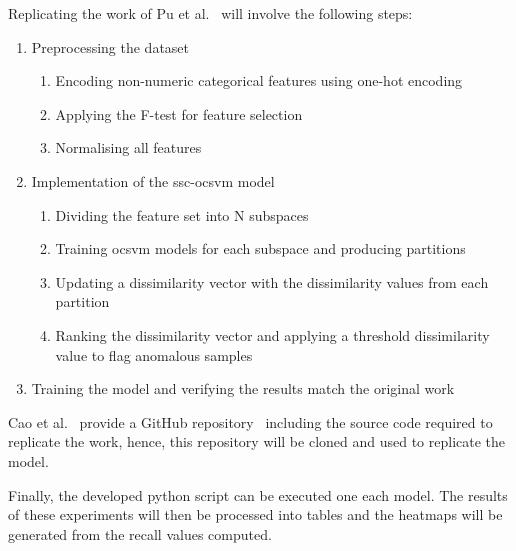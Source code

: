 Replicating the work of Pu et al.~\cite{Pu} will involve the following steps:
\begin{enumerate}
      \item Preprocessing the dataset
            \begin{enumerate}
                  \item Encoding non-numeric categorical features using one-hot encoding
                  \item Applying the F-test for feature selection
                  \item Normalising all features
            \end{enumerate}
      \item Implementation of the \gls{ssc}-\gls{ocsvm} model
      \begin{enumerate}
            \item Dividing the feature set into N subspaces
            \item Training \gls{ocsvm} models for each subspace and producing partitions
            \item Updating a dissimilarity vector with the dissimilarity values from each partition
            \item Ranking the dissimilarity vector and applying a threshold dissimilarity value to flag anomalous samples
      \end{enumerate}
      \item Training the model and verifying the results match the original work
\end{enumerate}

Cao et al.~\cite{Cao} provide a GitHub repository~\cite{CaoGit} including the
source code required to replicate the work, hence, this repository will be
cloned and used to replicate the model.

Finally, the developed python script can be executed one each model. The
results of these experiments will then be processed into tables and the
heatmaps will be generated from the recall values computed.
